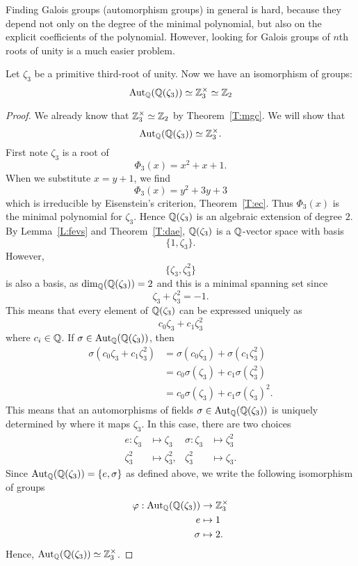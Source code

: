 \documentclass{ximera}
\begin{document}
Finding Galois groups (automorphism groups) in general is hard,
because they depend not only on the degree of the minimal polynomial,
but also on the explicit coefficients of the polynomial. However,
looking for Galois groups of $n$th roots of unity is a much easier
problem.

\begin{example}[$\boldsymbol{\aut_{\pmb \Q}\pmb(\pmb\Q\pmb(\zeta_3\pmb)\pmb)}$]
  Let $\zeta_3$ be a primitive third-root of
  unity. Now we have an isomorphism of groups:
  \[
  \operatorname{Aut}_{\mathbb Q}(\mathbb Q(\zeta_3))\simeq\mathbb Z_3^\times\simeq \mathbb Z_2
  \]
  \begin{proof}
    We already know that $\mathbb Z_3^\times\simeq \mathbb Z_2$ by
    Theorem~\ref{T:mgc}. We will show that
    \[
    \operatorname{Aut}_{\mathbb Q}(\mathbb Q(\zeta_3))\simeq\mathbb Z_3^\times.
    \]
    First note $\zeta_3$ is a root of
    \[
    \Phi_3(x) = x^2 + x + 1. 
    \]
    When we substitute $x = y+ 1$, we find
    \[
    \Phi_3(x) = y^2 + 3y + 3
    \]
    which is irreducible by Eisenstein's criterion,
    Theorem~\ref{T:ec}. Thus $\Phi_3(x)$ is the minimal polynomial for
    $\zeta_3$. Hence $\mathbb Q(\zeta_3)$ is an algebraic extension of degree
    $2$. By Lemma~\ref{L:fevs} and Theorem~\ref{T:dae}, $\mathbb Q(\zeta_3)$
    is a $\mathbb Q$-vector space with basis
    \[
    \{1,\zeta_3\}.
    \]
    However, 
    \[
    \{\zeta_3,\zeta_3^2\}
    \]
    is also a basis, as $\dim_\mathbb Q(\mathbb Q(\zeta_3))=2$ and this is a minimal
    spanning set since
    \[
    \zeta_3 + \zeta_3^2 = -1.
    \]
    This means that every element of $\mathbb Q(\zeta_3)$ can be expressed
    uniquely as
    \[
    c_0\zeta_3 + c_1 \zeta_3^2
    \]
    where $c_i\in\mathbb Q$. If $\sigma\in\operatorname{Aut}_\mathbb Q(\mathbb Q(\zeta_3))$, then
    \begin{align*}
      \sigma(c_0\zeta_3 + c_1 \zeta_3^2) &= \sigma(c_0\zeta_3) + \sigma(c_1 \zeta_3^2)\\
      &= c_0 \sigma(\zeta_3) + c_1 \sigma(\zeta_3^2)\\
      &= c_0 \sigma(\zeta_3) + c_1 \sigma(\zeta_3)^2.
    \end{align*}
    This means that an automorphisms of fields $\sigma \in
    \operatorname{Aut}_\mathbb Q(\mathbb Q(\zeta_3))$ is uniquely determined by where it maps
    $\zeta_3$. In this case, there are two choices
    \begin{align*}
      e :\zeta_3 &\mapsto \zeta_3 &  \sigma :\zeta_3 &\mapsto \zeta_3^2\\
         \zeta_3^2 &\mapsto \zeta_3^2, &          \zeta_3^2 &\mapsto \zeta_3.
    \end{align*}
    Since $\operatorname{Aut}_\mathbb Q(\mathbb Q(\zeta_3)) = \{e,\sigma\}$ as defined above, we
    write the following isomorphism of groups
    \begin{align*}
      \varphi: \operatorname{Aut}_\mathbb Q(\mathbb Q(\zeta_3)) &\to \mathbb Z_3^\times\\
      e &\mapsto 1\\
      \sigma &\mapsto 2.
    \end{align*}
    Hence, $\operatorname{Aut}_\mathbb Q(\mathbb Q(\zeta_3))\simeq\mathbb Z_3^\times$.
  \end{proof}
\end{example}
\end{document}
